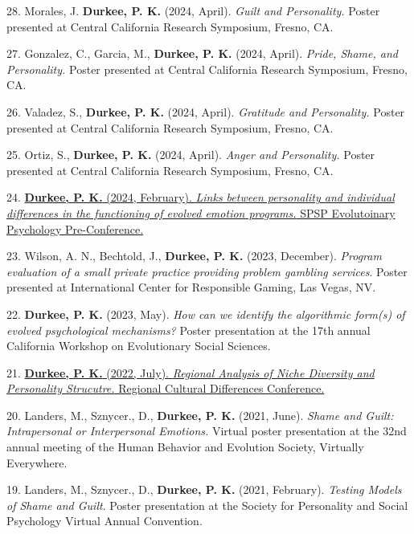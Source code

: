 \documentclass[10pt,]{article}
\begin{document}
28. \hangindent=0.5in Morales\textsuperscript{\faChevronCircleDown}, J.
\textbf{Durkee, P. K.} (2024, April). \emph{Guilt and Personality.}
Poster presented at Central California Research Symposium, Fresno, CA.

27. \hangindent=0.5in Gonzalez\textsuperscript{\faChevronCircleDown},
C., Garcia, M., \textbf{Durkee, P. K.} (2024, April). \emph{Pride,
Shame, and Personality.} Poster presented at Central California Research
Symposium, Fresno, CA.

26. \hangindent=0.5in Valadez\textsuperscript{\faChevronCircleDown}, S.,
\textbf{Durkee, P. K.} (2024, April). \emph{Gratitude and Personality.}
Poster presented at Central California Research Symposium, Fresno, CA.

25. \hangindent=0.5in Ortiz\textsuperscript{\faChevronCircleDown}, S.,
\textbf{Durkee, P. K.} (2024, April). \emph{Anger and Personality.}
Poster presented at Central California Research Symposium, Fresno, CA.

24. \hangindent=0.5in \href{https://osf.io/9nk5w/}{\textbf{Durkee, P.
K.} (2024, February). \emph{Links between personality and individual
differences in the functioning of evolved emotion programs.} SPSP
Evolutoinary Psychology Pre-Conference.}

23. \hangindent=0.5in Wilson, A. N., Bechtold, J., \textbf{Durkee, P.
K.} (2023, December). \emph{Program evaluation of a small private
practice providing problem gambling services}. Poster presented at
International Center for Responsible Gaming, Las Vegas, NV.

22. \hangindent=0.5in \textbf{Durkee, P. K.} (2023, May). \emph{How can
we identify the algorithmic form(s) of evolved psychological
mechanisms?} Poster presentation at the 17th annual California Workshop
on Evolutionary Social Sciences.

21. \hangindent=0.5in
\href{http://www.pdurkee.com/files/pubs/geo_psych_poster.pdf}{\textbf{Durkee,
P. K.} (2022, July). \emph{Regional Analysis of Niche Diversity and
Personality Strucutre.} Regional Cultural Differences Conference.}

20. \hangindent=0.5in Landers, M., Sznycer., D., \textbf{Durkee, P. K.}
(2021, June). \emph{Shame and Guilt: Intrapersonal or Interpersonal
Emotions.} Virtual poster presentation at the 32nd annual meeting of the
Human Behavior and Evolution Society, Virtually Everywhere.

19. \hangindent=0.5in Landers, M., Sznycer., D., \textbf{Durkee, P. K.}
(2021, February). \emph{Testing Models of Shame and Guilt}. Poster
presentation at the Society for Personality and Social Psychology
Virtual Annual Convention.
\end{document}
